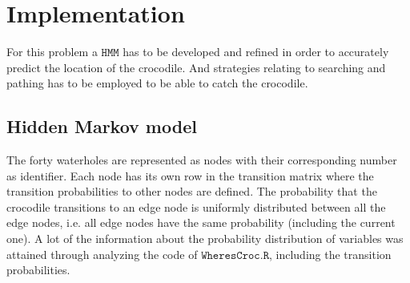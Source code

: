 \documentclass[12pt, a4paper]{article}
\newcommand{\HMM}[0]{%
  \mathtt{HMM}
}
\begin{document}


\section{Implementation}\label{sec:implementation}

For this problem a $\HMM$ has to be developed and refined in order to accurately predict the location of the crocodile. And strategies relating to searching and pathing has to be employed to be able to catch the crocodile. 
%
%

\subsection{Hidden Markov model}

The forty waterholes are represented as nodes with their corresponding number as identifier. Each node has its own row in the transition matrix where the transition probabilities to other nodes are defined. The probability that the crocodile transitions to an edge node is uniformly distributed between all the edge nodes, i.e. all edge nodes have the same probability (including the current one). A lot of the information about the probability distribution of variables was attained through analyzing the code of $ \mathtt{WheresCroc.R}$, including the transition probabilities.
\end{document}

